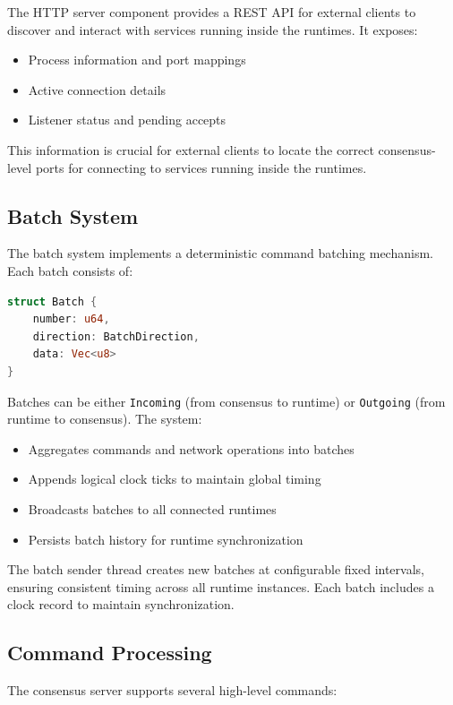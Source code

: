 \documentclass[10pt]{IEEEtran}
\begin{document}
The HTTP server component provides a REST API for external clients to discover and interact with services running inside the runtimes. It exposes:

\begin{itemize}
    \item Process information and port mappings
    \item Active connection details
    \item Listener status and pending accepts
\end{itemize}

This information is crucial for external clients to locate the correct consensus-level ports for connecting to services running inside the runtimes.

\subsection{Batch System}

The batch system implements a deterministic command batching mechanism. Each batch consists of:

\begin{lstlisting}[language=Rust]
struct Batch {
    number: u64,
    direction: BatchDirection,
    data: Vec<u8>
}
\end{lstlisting}

Batches can be either \texttt{Incoming} (from consensus to runtime) or \texttt{Outgoing} (from runtime to consensus). The system:

\begin{itemize}
    \item Aggregates commands and network operations into batches
    \item Appends logical clock ticks to maintain global timing
    \item Broadcasts batches to all connected runtimes
    \item Persists batch history for runtime synchronization
\end{itemize}

The batch sender thread creates new batches at configurable fixed intervals, ensuring consistent timing across all runtime instances. Each batch includes a clock record to maintain synchronization.

\subsection{Command Processing}

The consensus server supports several high-level commands:
\end{document}
